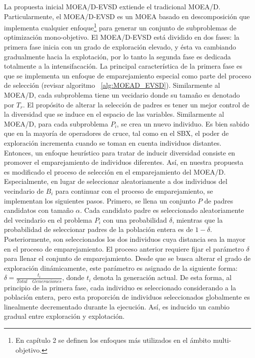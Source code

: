 La propuesta inicial MOEA/D-EVSD extiende el tradicional MOEA/D.
%
Particularmente, el MOEA/D-EVSD es un MOEA basado en descomposición que implementa cualquier enfoque\footnote{En capítulo 2 se definen los enfoques más utilizados en el ámbito multi-objetivo.} para generar un conjunto de subproblemas de optimización mono-objetivo.
%
El MOEA/D-EVSD está dividido en dos fases: la primera fase inicia con un grado de exploración elevado, y ésta va cambiando gradualmente hacia la explotación, por lo tanto la segunda fase es dedicada totalmente a la intensifacación.
%
La principal característica de la primera fase es que se implementa un enfoque de emparejamiento especial como parte del proceso de selección (revisar algoritmo ~\ref{alg:MOEAD_EVSD}).
%
Similarmente al MOEA/D,  cada subproblema tiene un vecidario donde su tamaño es denotado por $T_r$.
%
El propósito de alterar la selección de padres es tener un mejor control de la diversidad que se induce en el espacio de las variables.
%
Similarmente al MOEA/D, para cada subproblema $P_i$, se crea un nuevo individuo.
%
Es bien sabido que en la mayoría de operadores de cruce, tal como en el SBX, el poder de exploración incrementa cuando se toman en cuenta individuos distantes.
%
Entonces, un enfoque heurístico para tratar de inducir diversidad consiste en promover el emparejamiento de individuos diferentes.
%
Así, en nuestra propuesta es modificado el proceso de selección en el emparejamiento del MOEA/D. 
%
Especialmente, en lugar de seleccionar aleatoriamente a dos individuos del vecindario de $B_i$ para continuar con el proceso de emparejamiento, se implementan los siguientes pasos.
%
Primero, se llena un conjunto $P$ de padres candidatos con tamaño $\alpha$.
%
Cada candidato padre es seleccionado aleatoriamente del vecindario en el problema $P_i$ con una probabilidad $\delta$, mientras que la probabilidad de seleccionar padres de la población entera es de $1-\delta$.
%
Posteriormente, son seleccionados los dos individuos cuya distancia sea la mayor en el proceso de emparejamiento.
%
El proceso anterior requiere fijar el parámetro $\delta$ para llenar el conjunto de emparejamiento.
%
Desde que se busca alterar el grado de exploración dinámicamente, este parámetro es asignado de la siguiente forma: $\delta = \frac{t_i}{Total\quad Generaciones}$, donde $t_i$ denota la generación actual.
%
De esta forma, al principio de la primera fase, cada individuo es seleccionado considerando a la población entera, pero esta proporción de individuos seleccionados globalmente es linealmente decrementado durante la ejecución.
%
Así, es inducido un cambio gradual entre exploración y explotación.
%

